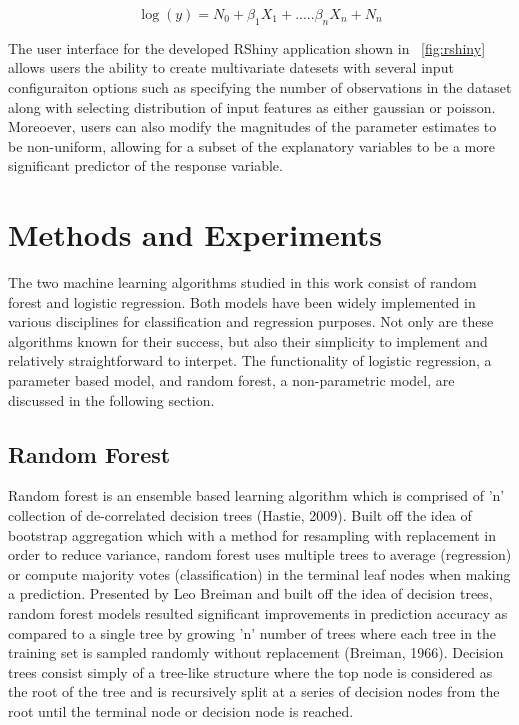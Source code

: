 \documentclass{llncs}
\begin{document}
\begin{equation}
\log(y) = N_{0} + \beta_{1}X_{1} + .....\beta_{n}X_{n} + N_{n} 
\end{equation}

The user interface for the developed RShiny application shown in ~\ref{fig:rshiny} allows users the ability to create multivariate datesets with several input configuraiton options such as specifying the number of observations in the dataset along with selecting distribution of input features as either gaussian or poisson. Moreoever, users can also modify the magnitudes of the parameter estimates to be non-uniform, allowing for a subset of the explanatory variables to be a more significant predictor of the response variable. 

\section{Methods and Experiments}

The two machine learning algorithms studied in this work consist of random forest and logistic regression. Both models have been widely implemented in various disciplines for classification and regression purposes. Not only are these algorithms known for their success, but also their simplicity to implement and relatively straightforward to interpet. The functionality of logistic regression, a parameter based model, and random forest, a non-parametric model, are discussed in the following section. 

\subsection{Random Forest}


Random forest is an ensemble based learning algorithm which is comprised of 'n' collection of de-correlated decision trees (Hastie, 2009). Built off the idea of bootstrap aggregation which with a method for resampling with replacement in order to reduce variance, random forest uses multiple trees to average (regression) or compute majority votes (classification) in the terminal leaf nodes when making a prediction. Presented by Leo Breiman and built off the idea of decision trees, random forest models resulted significant improvements in prediction accuracy as compared to a single tree by growing 'n' number of trees where each tree in the training set is sampled randomly without replacement (Breiman, 1966). Decision trees consist simply of a tree-like structure where the top node is considered as the root of the tree and is recursively split at a series of decision nodes from the root until the terminal node or decision node is reached. 
\end{document}
